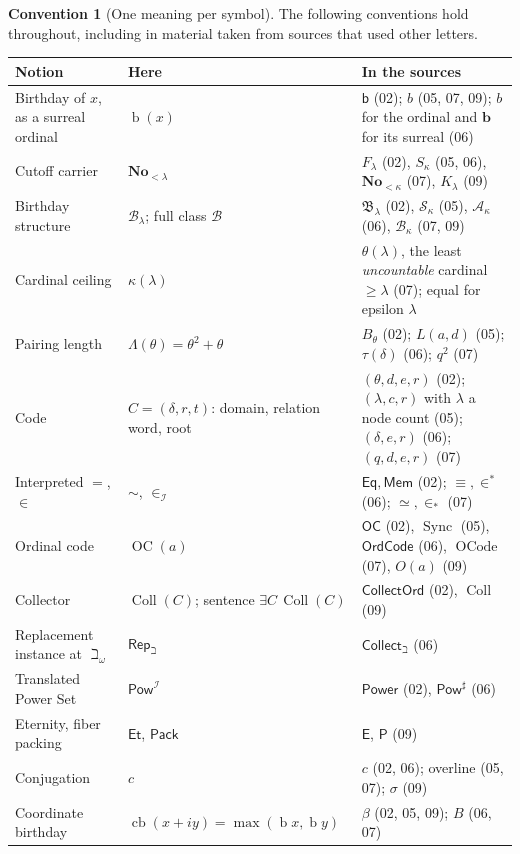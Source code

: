 \documentclass[11pt,letterpaper]{article}
\theoremstyle{definition}
\newtheorem{convention}[convention]{Convention}\aliascntresetthe{convention}
\theoremstyle{remark}
\newcommand{\No}{\mathbf{No}}
\newcommand{\bd}{\operatorname{b}}
\newcommand{\B}{\mathcal B}
\newcommand{\I}{\mathcal I}
\newcommand{\Coll}{\operatorname{Coll}}
\newcommand{\OC}{\operatorname{OC}}
\newcommand{\Et}{\mathsf{Et}}
\newcommand{\Pack}{\mathsf{Pack}}
\newcommand{\PowI}{\mathsf{Pow}^{\I}}
\newcommand{\RepB}{\mathsf{Rep}_{\beth}}
\newcommand{\cb}{\operatorname{cb}}
\begin{document}
\begin{convention}[One meaning per symbol]\label{hset:conv:notation}
The following conventions hold throughout, including in material taken from
sources that used other letters.
\begin{center}\small
\begin{longtable}{@{}P{0.27\textwidth}P{0.34\textwidth}P{0.31\textwidth}@{}}
\toprule
Notion & Here & In the sources\\
\midrule\endhead
Birthday of $x$, as a surreal ordinal & $\bd(x)$ & $\mathsf b$ (02); $b$ (05, 07, 09); $b$ for the ordinal and $\mathbf b$ for its surreal (06)\\
Cutoff carrier & $\No_{<\lambda}$ & $F_\lambda$ (02), $S_\kappa$ (05, 06), $\No_{<\kappa}$ (07), $K_\lambda$ (09)\\
Birthday structure & $\B_\lambda$; full class $\B$ & $\mathfrak B_\lambda$ (02), $\mathcal S_\kappa$ (05), $\mathcal A_\kappa$ (06), $\B_\kappa$ (07, 09)\\
Cardinal ceiling & $\kappa(\lambda)$ & $\theta(\lambda)$, the least \emph{uncountable} cardinal $\ge\lambda$ (07); equal for epsilon $\lambda$\\
Pairing length & $\Lambda(\theta)=\theta^2+\theta$ & $B_\theta$ (02); $L(a,d)$ (05); $\tau(\delta)$ (06); $q^2$ (07)\\
Code & $C=(\delta,r,t)$: domain, relation word, root & $(\theta,d,e,r)$ (02); $(\lambda,c,r)$ with $\lambda$ a node count (05); $(\delta,e,r)$ (06); $(q,d,e,r)$ (07)\\
Interpreted $=$, $\in$ & $\sim$, $\in_\I$ & $\mathsf{Eq},\mathsf{Mem}$ (02); $\equiv,\in^*$ (06); $\simeq,\in_*$ (07)\\
Ordinal code & $\OC(a)$ & $\mathsf{OC}$ (02), $\operatorname{Sync}$ (05), $\mathsf{OrdCode}$ (06), $\operatorname{OCode}$ (07), $O(a)$ (09)\\
Collector & $\Coll(C)$; sentence $\exists C\,\Coll(C)$ & $\mathsf{CollectOrd}$ (02), $\operatorname{Coll}$ (09)\\
Replacement instance at $\beth_\omega$ & $\RepB$ & $\mathsf{Collect}_\beth$ (06)\\
Translated Power Set & $\PowI$ & $\mathsf{Power}$ (02), $\mathsf{Pow}^\sharp$ (06)\\
Eternity, fiber packing & $\Et$, $\Pack$ & $\mathsf E$, $\mathsf P$ (09)\\
Conjugation & $c$ & $c$ (02, 06); overline (05, 07); $\sigma$ (09)\\
Coordinate birthday & $\cb(x+iy)=\max(\bd x,\bd y)$ & $\beta$ (02, 05, 09); $B$ (06, 07)\\

\end{longtable}
\end{center}
\end{convention}
\end{document}
